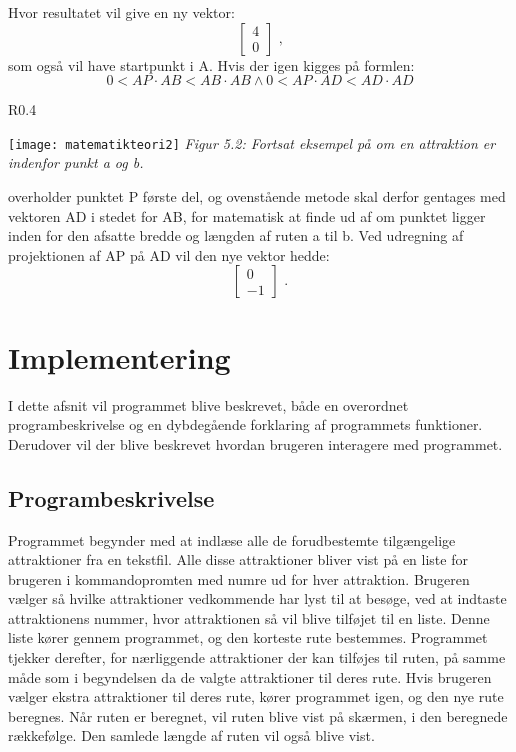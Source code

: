 Hvor resultatet vil give en ny vektor: \[ \begin{bmatrix} 4 \\ 0 \end{bmatrix} \text{ ,} \]  som også vil have startpunkt i A. Hvis der igen kigges på formlen:
\[0 < AP \cdot AB < AB \cdot AB \wedge 0 < AP \cdot AD < AD \cdot AD \]
\begin{wrapfigure}{R}{0.4\textwidth}
  \vspace{-20pt}
  \begin{center}
    \texttt{[image: matematikteori2]} \newline
    \textit{Figur 5.2: Fortsat eksempel på om en attraktion er indenfor punkt a og b.}\newline
  \end{center}
  \vspace{-20pt}
\end{wrapfigure}

overholder punktet P første del, og ovenstående metode skal derfor gentages med vektoren AD i stedet for AB, for matematisk at finde ud af om punktet ligger inden 	for den afsatte bredde og længden af ruten a til b. Ved udregning af projektionen af AP på AD vil den nye vektor hedde: \[ \begin{bmatrix} 0 \\ -1 \end{bmatrix} \text{ .} \]\newline
\newline

\section{Implementering}
I dette afsnit vil programmet blive beskrevet, både en overordnet programbeskrivelse og en dybdegående forklaring af programmets funktioner. Derudover vil der blive beskrevet hvordan brugeren interagere med programmet. 

\subsection{Programbeskrivelse}
Programmet begynder med at indlæse alle de forudbestemte tilgængelige attraktioner fra en tekstfil. Alle disse attraktioner bliver vist på en liste for brugeren i kommandopromten med numre ud for hver attraktion. Brugeren vælger så hvilke attraktioner vedkommende har lyst til at besøge, ved at indtaste attraktionens nummer, hvor attraktionen så vil blive tilføjet til en liste. Denne liste kører gennem programmet, og den korteste rute bestemmes. Programmet tjekker derefter, for nærliggende attraktioner der kan tilføjes til ruten, på samme måde som i begyndelsen da de valgte attraktioner til deres rute. Hvis brugeren vælger ekstra attraktioner til deres rute, kører programmet igen, og den nye rute beregnes.  Når ruten er beregnet, vil ruten blive vist på skærmen, i den beregnede rækkefølge. Den samlede længde af ruten vil også blive vist.
